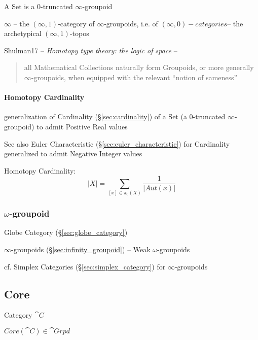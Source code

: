 A Set is a $0$-truncated $\infty$-groupoid %

$\infty$ -- the $(\infty,1)$-category of $\infty$-groupoids,
i.e. of $(\infty,0)-categories$-- the archetypical
$(\infty,1)$-topos %

Shulman17 -- \emph{Homotopy type theory: the logic of space} --
\begin{quote}
all Mathematical Collections naturally form Groupoids, or more
generally $\infty$-groupoids, when equipped with the relevant ``notion
of sameness''
\end{quote}



\paragraph{Homotopy Cardinality}\label{sec:homotopy_cardinality}\hfill

generalization of Cardinality (\S\ref{sec:cardinality}) of a Set (a
$0$-truncated $\infty$-groupoid) to admit Positive Real values

\fist See also Euler Characteristic (\S\ref{sec:euler_characteristic})
for Cardinality generalized to admit Negative Integer values

Homotopy Cardinality:
\[
  |X| = \sum_{[x] \in \pi_0(X)} \frac{1}{|Aut(x)|}
\] %



\subsubsection{$\omega$-groupoid}\label{sec:omega_groupoid}

Globe Category (\S\ref{sec:globe_category})

$\infty$-groupoids (\S\ref{sec:infinity_groupoid}) -- Weak
$\omega$-groupoids

\fist cf. Simplex Categories (\S\ref{sec:simplex_category}) for
$\infty$-groupoids



\subsection{Core}\label{sec:core}

Category $\cat{C}$

$Core(\cat{C}) \in \cat{Grpd}$



